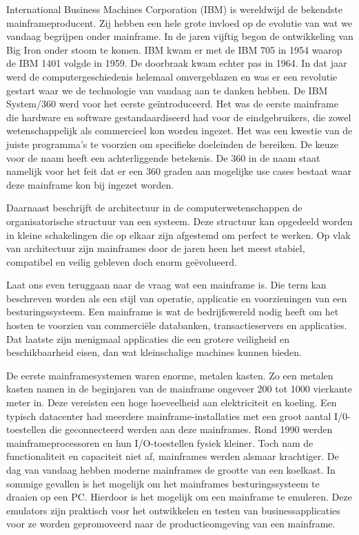 International Business Machines Corporation (IBM) is wereldwijd de bekendste mainframeproducent. Zij hebben een hele grote invloed op de evolutie van wat we vandaag begrijpen onder mainframe. In de jaren vijftig begon de ontwikkeling van Big Iron onder stoom te komen. IBM kwam er met de IBM 705 in 1954 waarop de IBM 1401 volgde in 1959. De doorbraak kwam echter pas in 1964. In dat jaar werd de computergeschiedenis helemaal omvergeblazen en was er een revolutie gestart waar we de technologie van vandaag aan te danken hebben. De IBM System/360 werd voor het eerste geïntroduceerd. Het was de eerste mainframe die hardware en software gestandaardiseerd had voor de eindgebruikers, die zowel wetenschappelijk als commercieel kon worden ingezet. Het was een kwestie van de juiste programma's te voorzien om specifieke doeleinden de bereiken. De keuze voor de naam heeft een achterliggende betekenis. De 360 in de naam staat namelijk voor het feit dat er een 360 graden aan mogelijke use cases bestaat waar deze mainframe kon bij ingezet worden.

Daarnaast beschrijft de architectuur in de computerwetenschappen  de organisatorische structuur van een systeem. Deze structuur kan opgedeeld worden in kleine schakelingen die op elkaar zijn afgestemd om perfect te werken. Op vlak van architectuur zijn mainframes door de jaren heen het meest stabiel, compatibel en veilig gebleven doch enorm geëvolueerd. 

Laat ons even teruggaan naar de vraag wat een mainframe is. Die term kan beschreven worden als een stijl van operatie, applicatie en voorzieningen van een besturingssysteem. Een mainframe is wat de bedrijfswereld nodig heeft om het hosten te voorzien van commerciële databanken, transactieservers en applicaties. Dat laatste zijn menigmaal applicaties die een grotere veiligheid en beschikbaarheid eisen, dan wat kleinschalige machines kunnen bieden. 

De eerste mainframesystemen waren enorme, metalen kasten. Zo een metalen kasten namen in de beginjaren van de mainframe ongeveer 200 tot 1000 vierkante meter in. Deze vereisten een hoge hoeveelheid aan elektriciteit en koeling. Een typisch datacenter had meerdere mainframe-installaties met een groot aantal I/0-toestellen die geconnecteerd werden aan deze mainframes. Rond 1990 werden mainframeprocessoren en hun I/O-toestellen fysiek kleiner. Toch nam de functionaliteit en capaciteit niet af, mainframes werden alsmaar krachtiger. De dag van vandaag hebben moderne mainframes de grootte van een koelkast. In sommige gevallen is het mogelijk om het mainframes besturingssysteem te draaien op een PC. Hierdoor is het mogelijk om een mainframe te emuleren. Deze emulators zijn praktisch voor het ontwikkelen en testen van businessapplicaties voor ze worden gepromoveerd naar de productieomgeving van een mainframe. 

